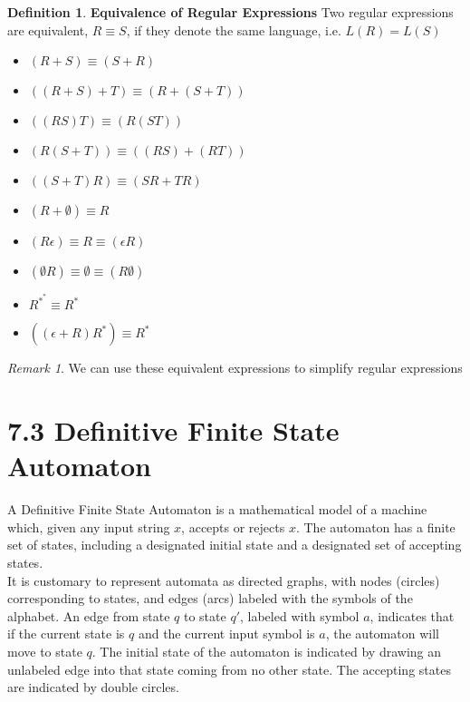 \documentclass[11pt]{article}
\theoremstyle{plain}%
\theoremstyle{definition}
\newtheorem{defn}{Definition}
\theoremstyle{remark}
\newtheorem*{rem}{Remark}
\begin{document}
\begin{defn}
  \textbf{Equivalence of Regular Expressions} Two regular expressions are equivalent, $R\equiv S$, if they denote the same language, i.e. $L(R) = L(S)$
  \begin{itemize}
    \item $(R+S)\equiv (S+R)$
    \item $((R+S) + T)\equiv (R+(S+T))$
    \item $((RS)T)\equiv (R(ST))$
    \item $(R(S+T))\equiv ((RS) + (RT))$
    \item $((S+T)R)\equiv (SR+TR)$
    \item $(R+\emptyset)\equiv R$
    \item $(R\epsilon)\equiv R\equiv (\epsilon R)$
    \item $(\emptyset R) \equiv \emptyset \equiv (R\emptyset)$
    \item $R^{*^*}\equiv R^*$
    \item $((\epsilon + R)R^*) \equiv R^*$
  \end{itemize}
  \begin{rem}
    We can use these equivalent expressions to simplify regular expressions
  \end{rem}
\end{defn}





\section*{7.3 Definitive Finite State Automaton}

A Definitive Finite State Automaton is a mathematical model of a machine which, given any input string $x$, accepts or rejects $x$. The automaton has a finite set of states, including a designated initial state and a designated set of accepting states. \\
It is customary to represent automata as directed graphs, with nodes (circles) corresponding to states, and edges (arcs) labeled with the symbols of the alphabet. An edge from state $q$ to state $q'$, labeled with symbol $a$, indicates that if the current state is $q$ and the current input symbol is $a$, the automaton will move to state $q$. The initial state of the automaton is indicated by drawing an unlabeled edge into that state coming from no other state. The accepting states are indicated by double circles.\\
\end{document}
